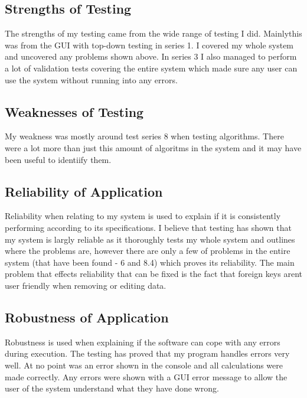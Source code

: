 \subsection{Strengths of Testing}

The strengths of my testing came from the wide range of testing I did. Mainlythis was from the GUI with top-down testing in series 1. I covered my whole system and uncovered any problems shown above. In series 3 I also managed to perform a lot of validation tests covering the entire system which made sure any user can use the system without running into any errors.

\subsection{Weaknesses of Testing}

My weakness was mostly around test series 8 when testing algorithms. There were a lot more than just this amount of algoritms in the system and it may have been useful to identiify them.

\subsection{Reliability of Application}

Reliability when relating to my system is used to explain if it is consistently performing according to its specifications. I believe that testing has shown that my system is largly reliable as it thoroughly tests my whole system and outlines where the problems are, however there are only a few of problems in the entire system (that have been found - 6 and 8.4) which proves its reliability. The main problem that effects reliability that can be fixed is the fact that foreign keys arent user friendly when removing or editing data.

\subsection{Robustness of Application}

Robustness is used when explaining if the software can cope with any errors during execution. The testing has proved that my program handles errors very well. At no point was an error shown in the console and all calculations were made correctly. Any errors were shown with a GUI error message to allow the user of the system understand what they have done wrong.
